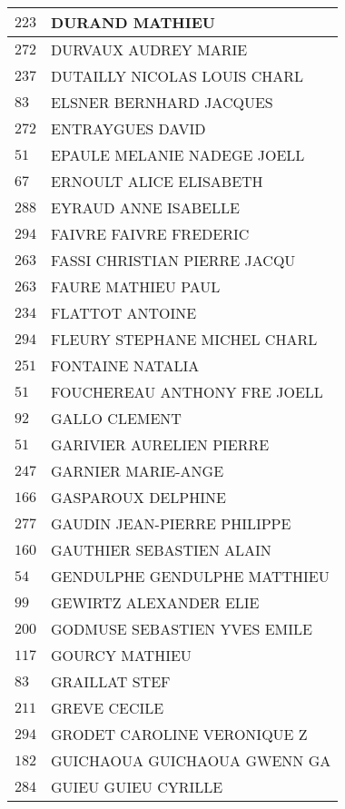 \begin{xltabular}{\linewidth}{|l|X|}
    \hline
    $223$ & DURAND MATHIEU \\
    \hline
    $272$ & DURVAUX AUDREY MARIE \\
    \hline
    $237$ & DUTAILLY NICOLAS LOUIS CHARL \\
    \hline
    $83$ & ELSNER BERNHARD JACQUES \\
    \hline
    $272$ & ENTRAYGUES DAVID \\
    \hline
    $51$ & EPAULE MELANIE NADEGE JOELL \\
    \hline
    $67$ & ERNOULT ALICE ELISABETH \\
    \hline
    $288$ & EYRAUD ANNE ISABELLE \\
    \hline
    $294$ & FAIVRE FAIVRE FREDERIC \\
    \hline
    $263$ & FASSI CHRISTIAN PIERRE JACQU \\
    \hline
    $263$ & FAURE MATHIEU PAUL \\
    \hline
    $234$ & FLATTOT ANTOINE \\
    \hline
    $294$ & FLEURY STEPHANE MICHEL CHARL \\
    \hline
    $251$ & FONTAINE NATALIA \\
    \hline
    $51$ & FOUCHEREAU ANTHONY FRE JOELL \\
    \hline
    $92$ & GALLO CLEMENT \\
    \hline
    $51$ & GARIVIER AURELIEN PIERRE \\
    \hline
    $247$ & GARNIER MARIE-ANGE \\
    \hline
    $166$ & GASPAROUX DELPHINE \\
    \hline
    $277$ & GAUDIN JEAN-PIERRE PHILIPPE \\
    \hline
    $160$ & GAUTHIER SEBASTIEN ALAIN \\
    \hline
    $54$ & GENDULPHE GENDULPHE MATTHIEU \\
    \hline
    $99$ & GEWIRTZ ALEXANDER ELIE \\
    \hline
    $200$ & GODMUSE SEBASTIEN YVES EMILE \\
    \hline
    $117$ & GOURCY MATHIEU \\
    \hline
    $83$ & GRAILLAT STEF \\
    \hline
    $211$ & GREVE CECILE \\
    \hline
    $294$ & GRODET CAROLINE VERONIQUE Z \\
    \hline
    $182$ & GUICHAOUA GUICHAOUA GWENN GA \\
    \hline
    $284$ & GUIEU GUIEU CYRILLE \\

\end{xltabular}
